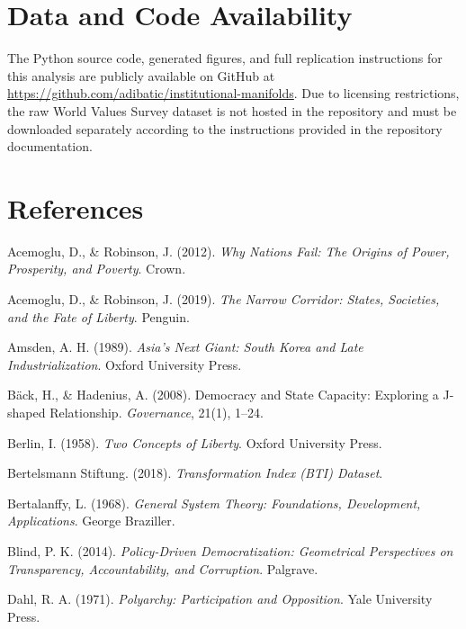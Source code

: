 \documentclass[12pt]{article}
\begin{document}
\section*{Data and Code Availability}
The Python source code, generated figures, and full replication instructions for this analysis are publicly available on GitHub at \url{https://github.com/adibatic/institutional-manifolds}. Due to licensing restrictions, the raw World Values Survey dataset is not hosted in the repository and must be downloaded separately according to the instructions provided in the repository documentation.

\section*{References}
\begin{description}

\item Acemoglu, D., \& Robinson, J. (2012). \textit{Why Nations Fail: The Origins of Power, Prosperity, and Poverty}. Crown.

\item Acemoglu, D., \& Robinson, J. (2019). \textit{The Narrow Corridor: States, Societies, and the Fate of Liberty}. Penguin.

\item Amsden, A. H. (1989). \textit{Asia's Next Giant: South Korea and Late Industrialization}. Oxford University Press.

\item Bäck, H., \& Hadenius, A. (2008). Democracy and State Capacity: Exploring a J-shaped Relationship. \textit{Governance}, 21(1), 1–24.

\item Berlin, I. (1958). \textit{Two Concepts of Liberty}. Oxford University Press.

\item Bertelsmann Stiftung. (2018). \textit{Transformation Index (BTI) Dataset}.

\item Bertalanffy, L. (1968). \textit{General System Theory: Foundations, Development, Applications}. George Braziller.

\item Blind, P. K. (2014). \textit{Policy-Driven Democratization: Geometrical Perspectives on Transparency, Accountability, and Corruption}. Palgrave.

\item Dahl, R. A. (1971). \textit{Polyarchy: Participation and Opposition}. Yale University Press.


\end{description}
\end{document}
